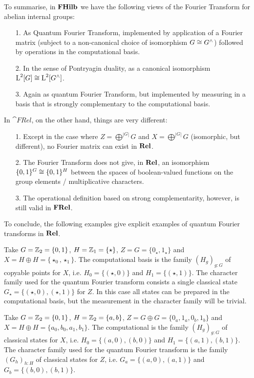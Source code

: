 To summarise, in $\mathbf{FHilb}$ we have the following views of the Fourier Transform for abelian internal groups:
\begin{enumerate}
\item[1.] As Quantum Fourier Transform, implemented by application of a Fourier matrix (subject to a non-canonical choice of isomorphism $G \cong G^\wedge$) followed by operations in the computational basis.
\item[2.] In the sense of Pontryagin duality, as a canonical isomorphism $\operatorname{L}^2[G] \cong \operatorname{L}^2[G^\wedge]$.
\item[3.] Again as quantum Fourier Transform, but implemented by measuring in a basis that is strongly complementary to the computational basis.
\end{enumerate}

In $\cat{FRel}$, on the other hand, things are very different:
\begin{enumerate}
\item[1.] Except in the case where $Z = \bigoplus^{|G|}G$ and $X = \bigoplus^{|G|}G$ (isomorphic, but different), no Fourier matrix can exist in $\mathbf{Rel}$.
\item[2.] The Fourier Transform does not give, in $\mathbf{Rel}$, an isomorphism $\{0,1\}^G \cong \{0,1\}^H$ between the spaces of boolean-valued functions on the group elements / multiplicative characters.
\item[3.] The operational definition based on strong complementarity, however, is still valid in $\mathbf{FRel}$. 
\end{enumerate}

To conclude, the following examples give explicit examples of quantum Fourier transforms in $\mathbf{Rel}$.

\begin{example}
Take $G=\mathbb{Z}_{2}=\{0,1\}$, $H=\mathbb{Z}_{1}=\{\star\}$, $Z = G = \{ 0_\star,1_\star \}$ and $X=H\oplus H = \{ \star_0,\star_1 \}$. The computational basis is the family $(H_g)_{g:G}$ of copyable points for $X$, i.e. $H_0 = \{(\star,0)\}$ and $H_1 = \{(\star,1)\}$. The character family used for the quantum Fourier transform consists a single classical state $G_\star = \{(\star,0), (\star,1)\}$ for $Z$. In this case all states can be prepared in the computational basis, but the measurement in the character family will be trivial.
\end{example}

\begin{example}
Take $G=\mathbb{Z}_{2}=\{0,1\}$, $H=\mathbb{Z}_{2}=\{a,b\}$, $Z = G \oplus G = \{ 0_a,1_a,0_b,1_b\}$ and $X= H \oplus H = \{ a_0, b_0, a_1, b_1 \}$. The computational  is the family $(H_g)_{g:G}$ of classical states for $X$, i.e. $H_0 = \{(a,0),(b,0)\}$ and $H_1 = \{(a,1),(b,1)\}$. The character family used for the quantum Fourier transform is the family $(G_h)_{h:H}$ of classical states for $Z$, i.e. $G_a = \{(a,0),(a,1)\}$ and $G_b = \{(b,0),(b,1)\}$.
\end{example}

